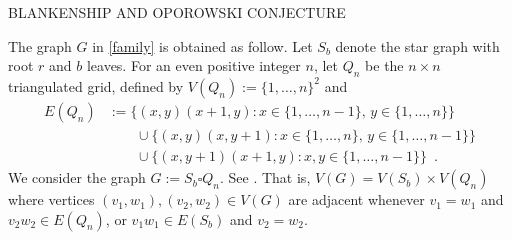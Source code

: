 \documentclass[kpfonts]{patmorin}
\begin{document}
BLANKENSHIP AND OPOROWSKI CONJECTURE \citep{BO99,BO01}



The graph $G$ in \cref{family} is obtained as follow. Let $S_b$ denote the star graph with root $r$ and $b$ leaves.  For an even positive integer $n$, let $Q_n$ be the $n\times n$ triangulated grid, defined by $V(Q_n):=\{1,\ldots,n\}^2$ and
\begin{align*}
E(Q_n) & :=\{(x,y)(x+1,y):x\in\{1,\ldots,n-1\},\,y\in\{1,\ldots,n\}\} \\
& \qquad \cup \{(x,y)(x,y+1):x\in\{1,\ldots,n\},\,y\in\{1,\ldots,n-1\}\} \\
& \qquad \cup \{(x,y+1)(x+1,y):x,y\in\{1,\ldots,n-1\}\} \enspace .
\end{align*}
We consider the graph $G:=S_b\square Q_n$. See . That is, $V(G)=V(S_b)\times V(Q_n)$ where vertices $(v_1,w_1),(v_2,w_2)\in V(G)$ are adjacent whenever $v_1=w_1$ and $v_2w_2\in E(Q_n)$, or $v_1w_1\in E(S_b)$ and $v_2=w_2$.
\end{document}
